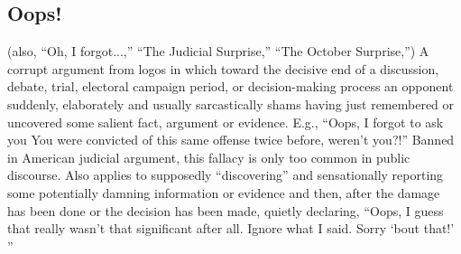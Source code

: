 \documentclass[10pt,a4paper,british]{article}
\begin{document}
\begin{multicols}{2}
    \subsection{Oops!} (also, ``Oh, I forgot...,'' ``The Judicial Surprise,''
    ``The October Surprise,'') A corrupt argument from logos in which toward
    the decisive end of a discussion, debate, trial, electoral campaign period,
    or decision{-}making process an opponent suddenly, elaborately and usually
    sarcastically shams having just remembered or uncovered some salient fact,
    argument or evidence.  E.g., ``Oops, I forgot to ask you  You were
    convicted of this same offense twice before, weren't you?!'' Banned in
    American judicial argument, this fallacy is only too common in public
    discourse. Also applies to supposedly ``discovering'' and sensationally
    reporting some potentially damning information or evidence and then, after
    the damage has been done or the decision has been made, quietly declaring,
    ``Oops, I guess that really wasn't that significant after all. Ignore what
    I said. Sorry `bout that!' '' 


\end{multicols}
\end{document}

